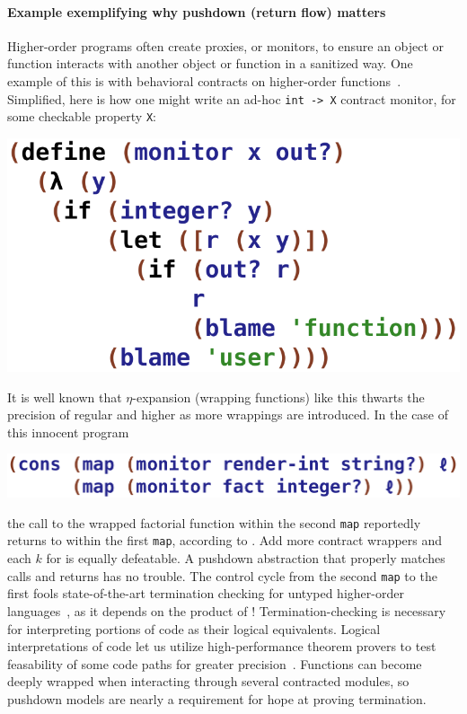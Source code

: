 \paragraph{Example exemplifying why pushdown (return flow) matters}
Higher-order programs often create proxies, or monitors, to ensure an object or function interacts with another object or function in a sanitized way.
%
One example of this is with behavioral contracts on higher-order functions~\citep{dvanhorn:Findler2002Contracts}.
%
Simplified, here is how one might write an ad-hoc \texttt{int -> X} contract monitor, for some checkable property \texttt{X}:
\begin{center}
 \includegraphics[scale=0.45]{monitor}
\end{center}
It is well known that $\eta$-expansion (wrapping functions) like this thwarts the precision of regular \zcfa{} and higher \kcfa{} as more wrappings are introduced.
%
In the case of this innocent program
\begin{center}
 \includegraphics[scale=0.45]{pair}
\end{center}
the call to the wrapped factorial function within the second \texttt{map} reportedly returns to within the first \texttt{map}, according to \zcfa{}.
%
Add more contract wrappers and each $k$ for \kcfa{} is equally defeatable.
%
A pushdown abstraction that properly matches calls and returns has no trouble.
%
The control cycle from the second \texttt{map} to the first fools state-of-the-art termination checking for untyped higher-order languages~\citep{ianjohnson:DBLP:conf/aplas/SereniJ05}, as it depends on the product of \zcfa{}!
%
Termination-checking is necessary for interpreting portions of code as their logical equivalents.
%
Logical interpretations of code let us utilize high-performance theorem provers to test feasability of some code paths for greater precision~\citep{liquid-haskell}.
%
Functions can become deeply wrapped when interacting through several contracted modules, so pushdown models are nearly a requirement for hope at proving termination.